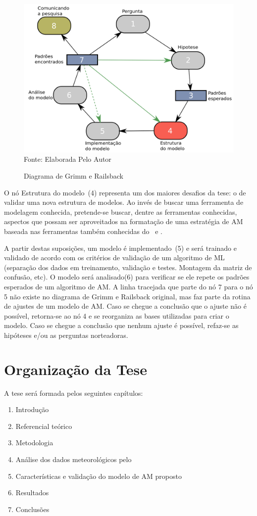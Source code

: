 \begin{figure}[!htb]
	\centering
	\caption{Diagrama de Grimm e Railsback}
	\includegraphics[width=.8\textwidth]{../Figures/intro/Ciclo_Grimm.png}
	\\{\footnotesize Fonte: Elaborada Pelo Autor}
	\label{fig:fluxoGrimm}
\end{figure}


O nó Estrutura do modelo~(4) representa um dos maiores desafios da tese: o de validar uma nova estrutura de modelos. Ao invés de buscar uma ferramenta de modelagem conhecida, pretende-se buscar, dentre as ferramentas conhecidas, aspectos que possam ser aproveitados na formatação de uma estratégia de AM baseada nas ferramentas também conhecidas do \pdcca~e \dmc.

A partir destas suposições, um modelo é implementado~(5) e será trainado e validado de acordo com os critérios de validação de um algoritmo de ML (separação dos dados em treinamento, validação e testes. Montagem da matriz de confusão, etc). O modelo será analisado(6) para verificar se ele repete os padrões esperados de um algoritmo de AM. A linha tracejada que parte do nó 7 para o nó 5 não existe no diagrama de Grimm e Railsback original, mas faz parte da rotina de ajustes de um modelo de AM. Caso se chegue a conclusão que o ajuste não é possível, retorna-se ao nó 4 e se reorganiza as bases utilizadas para criar o modelo. Caso se chegue a conclusão que nenhum ajuste é possível, refaz-se as hipóteses e/ou as perguntas norteadoras. 


\section{Organização da Tese}
\label{sec:organizacao}

A tese será formada pelos seguintes capítulos:
\begin{enumerate}
	\item Introdução
	\item Referencial teórico
	\item Metodologia
	\item Análise dos dados meteorológicos pelo \dmc
	\item Características e validação do modelo de AM proposto
	\item Resultados
	\item Conclusões
\end{enumerate}
